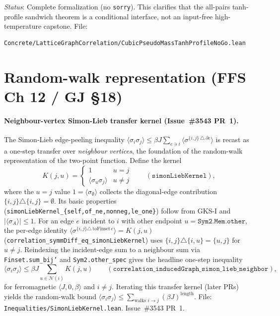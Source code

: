 \documentclass[a4paper,11pt]{article}
\begin{document}
\noindent\textit{Status}: Complete formalization (no \texttt{sorry}).  This
clarifies that the all-pairs tanh-profile sandwich theorem is a conditional
interface, not an input-free high-temperature capstone.
File:
\begin{Verbatim}[breaklines=true]
Concrete/LatticeGraphCorrelation/CubicPseudoMassTanhProfileNoGo.lean
\end{Verbatim}

\section{Random-walk representation (FFS Ch 12 / GJ \S18)}

\paragraph{Neighbour-vertex Simon-Lieb transfer kernel (Issue~\#3543 PR~1).}
The Simon-Lieb edge-peeling inequality
$\langle\sigma_i\sigma_j\rangle \le \beta J \sum_{e \ni i}
  \langle\sigma^{\{i,j\}\,\triangle\,\partial e}\rangle$ is recast as a one-step
transfer over \emph{neighbour vertices}, the foundation of the random-walk
representation of the two-point function. Define the kernel
\[
  K(j,u) = \begin{cases} 1 & u = j \\ \langle\sigma_u\sigma_j\rangle & u \ne j
  \end{cases}
  \qquad (\texttt{simonLiebKernel}),
\]
where the $u=j$ value $1 = \langle\sigma_\emptyset\rangle$ collects the
diagonal-edge contribution $\{i,j\}\triangle\{i,j\} = \emptyset$. Its basic
properties (\texttt{simonLiebKernel\_\{self,of\_ne,nonneg,le\_one\}}) follow from
GKS-I and $|\langle\sigma_A\rangle| \le 1$. For an edge $e$ incident to $i$ with
other endpoint $u = \texttt{Sym2.Mem.other}$, the per-edge identity
$\langle\sigma^{\{i,j\}\triangle\,\mathrm{toFinset}\,e}\rangle = K(j,u)$
(\texttt{correlation\_symmDiff\_eq\_simonLiebKernel}) uses
$\{i,j\}\triangle\{i,u\} = \{u,j\}$ for $u \ne j$. Reindexing the incident-edge
sum to a neighbour sum via \texttt{Finset.sum\_bij'} and \texttt{Sym2.other\_spec}
gives the headline one-step inequality
\[
  \langle\sigma_i\sigma_j\rangle
    \le \beta J \sum_{u \in \mathcal N(i)} K(j,u)
  \qquad (\texttt{correlation\_inducedGraph\_simon\_lieb\_neighbor}),
\]
for ferromagnetic $\langle J,0,\beta\rangle$ and $i \ne j$. Iterating this
transfer kernel (later PRs) yields the random-walk bound
$\langle\sigma_i\sigma_j\rangle \le \sum_{\text{walks } i \to j}(\beta J)^{\text{length}}$.
File: \texttt{Inequalities/SimonLiebKernel.lean}. Issue~\#3543 PR~1.
\end{document}
